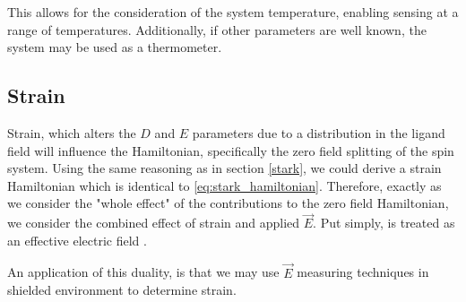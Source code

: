 
This allows for the consideration of the system temperature, enabling sensing at a range of temperatures. Additionally, if other parameters are well known, the system may be used as a thermometer.

\subsection{Strain}
Strain, which alters the $D$ and $E$ parameters due to a distribution in the ligand field \cite{Jeschke} will influence the Hamiltonian, specifically the zero field splitting of the spin system. Using the same reasoning as
in section \ref{stark}, we could derive a strain Hamiltonian which is identical to \eqref{eq:stark_hamiltonian}.
Therefore, exactly as we consider the "whole effect" of the contributions to the zero field Hamiltonian, we consider
the combined effect of strain and applied $\vec{E}$. Put simply,  is treated as an effective electric
field \cite{PhysRevLett.112.187601}.

An application of this duality, is that we may use $\vec{E}$ measuring techniques in shielded environment to determine strain.



